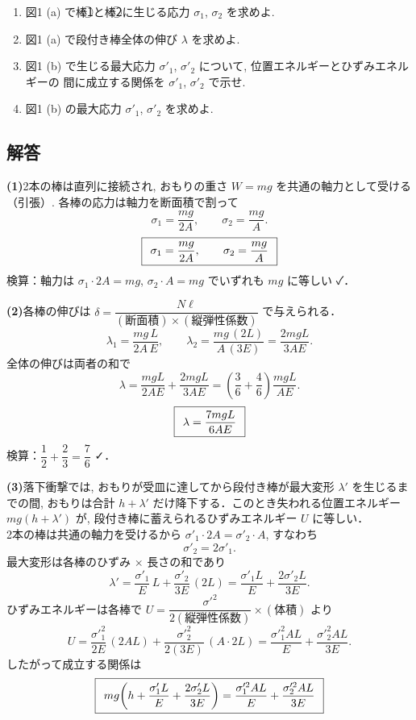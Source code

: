 \documentclass[11pt,a4paper]{article}
\begin{document}
\begin{enumerate}[label=(\arabic*)]
  \item 図1 (a) で棒\textcircled{1}と棒\textcircled{2}に生じる応力 $\sigma_1$, $\sigma_2$ を求めよ.
  \item 図1 (a) で段付き棒全体の伸び $\lambda$ を求めよ.
  \item 図1 (b) で生じる最大応力 $\sigma'_1$, $\sigma'_2$ について, 位置エネルギーとひずみエネルギーの
        間に成立する関係を $\sigma'_1$, $\sigma'_2$ で示せ.
  \item 図1 (b) の最大応力 $\sigma'_1$, $\sigma'_2$ を求めよ.
\end{enumerate}

\subsection*{解答}

\noindent\textbf{(1)}\quad 2本の棒は直列に接続され, おもりの重さ $W=mg$ を共通の軸力として受ける（引張）.
各棒の応力は軸力を断面積で割って
\[
  \sigma_1 = \frac{mg}{2A},\qquad \sigma_2 = \frac{mg}{A}.
\]
\[
  \boxed{\,\;\sigma_1 = \dfrac{mg}{2A},\qquad \sigma_2 = \dfrac{mg}{A}\;\,}
\]
検算：軸力は $\sigma_1\cdot 2A = mg$, $\sigma_2\cdot A = mg$ でいずれも $mg$ に等しい ✓．

\medskip
\noindent\textbf{(2)}\quad 各棒の伸びは $\delta=\dfrac{N\ell}{(\text{断面積})\times(\text{縦弾性係数})}$ で与えられる．
\[
  \lambda_1 = \frac{mg\,L}{2A\,E},\qquad
  \lambda_2 = \frac{mg\,(2L)}{A\,(3E)} = \frac{2mgL}{3AE}.
\]
全体の伸びは両者の和で
\[
  \lambda = \frac{mgL}{2AE} + \frac{2mgL}{3AE}
          = \left(\frac{3}{6}+\frac{4}{6}\right)\frac{mgL}{AE}.
\]
\[
  \boxed{\,\;\lambda = \dfrac{7mgL}{6AE}\;\,}
\]
検算：$\dfrac{1}{2}+\dfrac{2}{3}=\dfrac{7}{6}$ ✓．

\medskip
\noindent\textbf{(3)}\quad 落下衝撃では, おもりが受皿に達してから段付き棒が最大変形 $\lambda'$ を生じるまでの間,
おもりは合計 $h+\lambda'$ だけ降下する．このとき失われる位置エネルギー $mg(h+\lambda')$ が,
段付き棒に蓄えられるひずみエネルギー $U$ に等しい．\\
2本の棒は共通の軸力を受けるから $\sigma'_1\cdot 2A = \sigma'_2\cdot A$, すなわち
\[
  \sigma'_2 = 2\sigma'_1 .
\]
最大変形は各棒のひずみ $\times$ 長さの和であり
\[
  \lambda' = \frac{\sigma'_1}{E}\,L + \frac{\sigma'_2}{3E}\,(2L)
           = \frac{\sigma'_1 L}{E} + \frac{2\sigma'_2 L}{3E}.
\]
ひずみエネルギーは各棒で $U=\dfrac{\sigma'^2}{2(\text{縦弾性係数})}\times(\text{体積})$ より
\[
  U = \frac{\sigma'^2_1}{2E}\,(2A L) + \frac{\sigma'^2_2}{2(3E)}\,(A\cdot 2L)
    = \frac{\sigma'^2_1 A L}{E} + \frac{\sigma'^2_2 A L}{3E}.
\]
したがって成立する関係は
\[
  \boxed{\,\;mg\!\left(h + \dfrac{\sigma'_1 L}{E} + \dfrac{2\sigma'_2 L}{3E}\right)
        = \dfrac{\sigma'^2_1 A L}{E} + \dfrac{\sigma'^2_2 A L}{3E}\;\,}
\]
\end{document}
